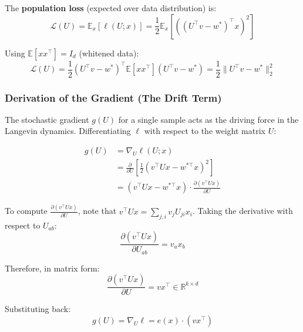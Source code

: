 \documentclass[
  journal=largetwo,
  simfonts=false,
  year=2025,
  volume=37,
]{cup-journal}
\begin{document}
The \textbf{population loss} (expected over data distribution) is:
\begin{equation}\label{eq:population_loss}
    \mathcal{L}(U) = \mathbb{E}_x [\ell(U; x)] = \frac{1}{2} \mathbb{E}_x \left[ \left( (U^\top v - w^*)^\top x \right)^2 \right]
\end{equation}

Using $\mathbb{E}[x x^\top] = I_d$ (whitened data):
\begin{equation}
    \mathcal{L}(U) = \frac{1}{2} (U^\top v - w^*)^\top \mathbb{E}[x x^\top] (U^\top v - w^*) = \frac{1}{2} \| U^\top v - w^* \|_2^2
\end{equation}



\subsubsection{Derivation of the Gradient (The Drift Term)}

The stochastic gradient $g(U)$ for a single sample acts as the driving force in the Langevin dynamics. Differentiating $\ell$ with respect to the weight matrix $U$:

\begin{align}
    g(U) &= \nabla_U \ell(U; x) \nonumber \\
    &= \frac{\partial}{\partial U} \left[ \frac{1}{2} (v^\top U x - w^{*\top} x)^2 \right] \nonumber \\
    &= (v^\top U x - w^{*\top} x) \cdot \frac{\partial (v^\top U x)}{\partial U}
\end{align}

To compute $\frac{\partial (v^\top U x)}{\partial U}$, note that $v^\top U x = \sum_{j,i} v_j U_{ji} x_i$. Taking the derivative with respect to $U_{ab}$:
\begin{equation}
    \frac{\partial (v^\top U x)}{\partial U_{ab}} = v_a x_b
\end{equation}

Therefore, in matrix form:
\begin{equation}
    \frac{\partial (v^\top U x)}{\partial U} = v x^\top \in \mathbb{R}^{k \times d}
\end{equation}

Substituting back:
\begin{equation}\label{eq:gradient_explicit}
    \boxed{g(U) = \nabla_U \ell = e(x) \cdot (v x^\top)}
\end{equation}
\end{document}
